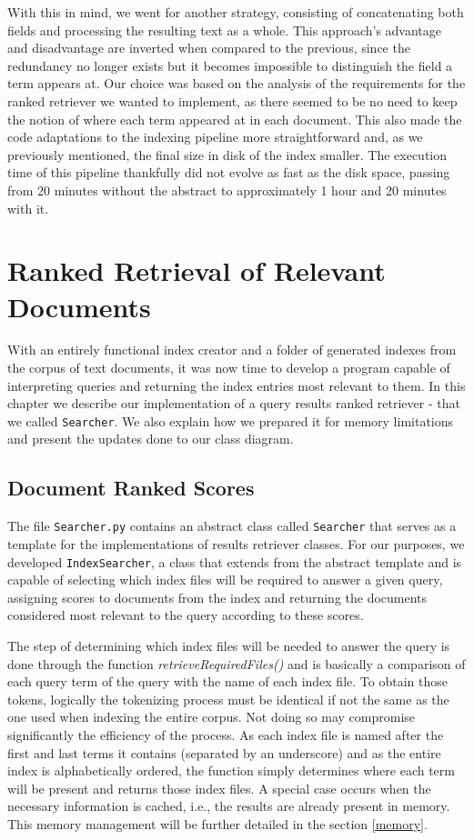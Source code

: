 \documentclass[12pt]{article}
\begin{document}
With this in mind, we went for another strategy, consisting of concatenating 
both fields and processing the resulting text as a whole.
This approach's advantage and disadvantage are inverted when compared to the 
previous, since the redundancy no longer exists but it becomes impossible to
distinguish the field a term appears at.
Our choice was based on the analysis of the requirements for the ranked retriever
we wanted to implement, as there seemed to be no need to keep the notion of where
each term appeared at in each document.
This also made the code adaptations to the indexing pipeline more straightforward 
and, as we previously mentioned, the final size in disk of the index smaller.
The execution time of this pipeline thankfully did not evolve as fast as the
disk space, passing from 20 minutes without the abstract to approximately 1 hour
and 20 minutes with it.

\newpage
\section{Ranked Retrieval of Relevant Documents}

With an entirely functional index creator and a folder of generated indexes from
the corpus of text documents, it was now time to develop a program capable of
interpreting queries and returning the index entries most relevant to them.
In this chapter we describe our implementation of a query results ranked retriever
- that we called \texttt{Searcher}.
We also explain how we prepared it for memory limitations and present the 
updates done to our class diagram.

\subsection{Document Ranked Scores}

The file \texttt{Searcher.py} contains an abstract class called \texttt{Searcher}
that serves as a template for the implementations of results retriever classes.
For our purposes, we developed \texttt{IndexSearcher}, a class that extends from
the abstract template and is capable of selecting which index files will be 
required to answer a given query, assigning scores to documents from the index
and returning the documents considered most relevant to the query according to 
these scores.

The step of determining which index files will be needed to answer the query
is done through the function \textit{retrieveRequiredFiles()} and is basically
a comparison of each query term of the query with the name of each index file. To obtain those tokens, logically the tokenizing process must be identical if not the same as the one used when indexing the entire corpus. Not doing so may compromise significantly the efficiency of the process.
As each index file is named after the first and last terms it contains (separated
by an underscore) and as the entire index is alphabetically ordered, the function
simply determines where each term will be present and returns those index files. A special case occurs when the necessary information is cached, i.e., the results are already present in memory. This memory management will be further detailed in the section \ref{memory}.
\end{document}
